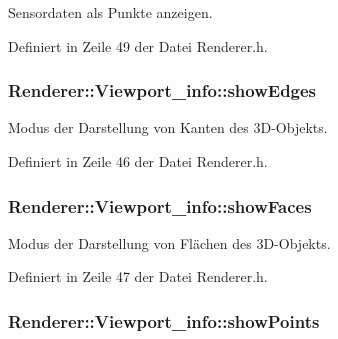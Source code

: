 Sensordaten als Punkte anzeigen. 



Definiert in Zeile 49 der Datei Renderer.\-h.

\hypertarget{structRenderer_1_1Viewport__info_a61ce4c293d9dc97da9b4ed2f8f7a36e0}{
\subsubsection[{show\-Edges}]{ Renderer\-::\-Viewport\-\_\-info\-::show\-Edges}}\label{structRenderer_1_1Viewport__info_a61ce4c293d9dc97da9b4ed2f8f7a36e0}


Modus der Darstellung von Kanten des 3\-D-\/\-Objekts. 



Definiert in Zeile 46 der Datei Renderer.\-h.

\hypertarget{structRenderer_1_1Viewport__info_aa1f3f4b18210cf0bc69df0c9015e8acf}{
\subsubsection[{show\-Faces}]{ Renderer\-::\-Viewport\-\_\-info\-::show\-Faces}}\label{structRenderer_1_1Viewport__info_aa1f3f4b18210cf0bc69df0c9015e8acf}


Modus der Darstellung von Flächen des 3\-D-\/\-Objekts. 



Definiert in Zeile 47 der Datei Renderer.\-h.

\hypertarget{structRenderer_1_1Viewport__info_ab95af83b6e3e068e14b37187a11709b7}{
\subsubsection[{show\-Points}]{ Renderer\-::\-Viewport\-\_\-info\-::show\-Points}}\label{structRenderer_1_1Viewport__info_ab95af83b6e3e068e14b37187a11709b7}


